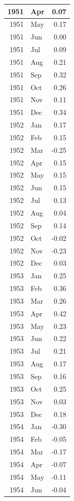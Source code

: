 \documentclass[
]{article}
\begin{document}
\begin{table}[H]
\begin{tabular}[t]{r|l|r}
\hline
1951 & Apr & 0.07\\
\hline
1951 & May & 0.17\\
\hline
1951 & Jun & 0.00\\
\hline
1951 & Jul & 0.09\\
\hline
1951 & Aug & 0.21\\
\hline
1951 & Sep & 0.32\\
\hline
1951 & Oct & 0.26\\
\hline
1951 & Nov & 0.11\\
\hline
1951 & Dec & 0.34\\
\hline
1952 & Jan & 0.17\\
\hline
1952 & Feb & 0.15\\
\hline
1952 & Mar & -0.25\\
\hline
1952 & Apr & 0.15\\
\hline
1952 & May & 0.15\\
\hline
1952 & Jun & 0.15\\
\hline
1952 & Jul & 0.13\\
\hline
1952 & Aug & 0.04\\
\hline
1952 & Sep & 0.14\\
\hline
1952 & Oct & -0.02\\
\hline
1952 & Nov & -0.23\\
\hline
1952 & Dec & 0.03\\
\hline
1953 & Jan & 0.25\\
\hline
1953 & Feb & 0.36\\
\hline
1953 & Mar & 0.26\\
\hline
1953 & Apr & 0.42\\
\hline
1953 & May & 0.23\\
\hline
1953 & Jun & 0.22\\
\hline
1953 & Jul & 0.21\\
\hline
1953 & Aug & 0.17\\
\hline
1953 & Sep & 0.16\\
\hline
1953 & Oct & 0.25\\
\hline
1953 & Nov & 0.03\\
\hline
1953 & Dec & 0.18\\
\hline
1954 & Jan & -0.30\\
\hline
1954 & Feb & -0.05\\
\hline
1954 & Mar & -0.17\\
\hline
1954 & Apr & -0.07\\
\hline
1954 & May & -0.11\\
\hline
1954 & Jun & -0.04\\

\end{tabular}
\end{table}
\end{document}
